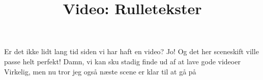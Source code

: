 \documentclass[a4paper,11pt]{article}
\title{Video: Rulletekster}
\begin{document}
\maketitle

\begin{sketch}
 Er det ikke lidt lang tid siden vi har haft en video?
 Jo! Og det her sceneskift ville passe helt perfekt!
 Damn, vi kan sku stadig finde ud af at lave gode videoer
 Virkelig, men nu tror jeg også næste scene er klar til at gå på
\end{sketch}
\end{document}
